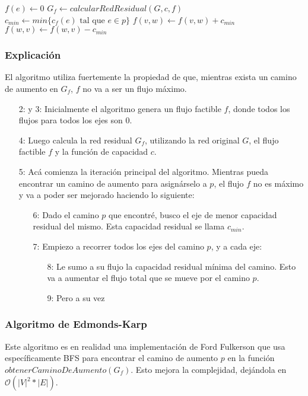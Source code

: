 \begin{algorithm}
\begin{algorithmic}[1]
    \State $f(e) \gets 0$
  \EndFor
  \State $G_f \gets calcularRedResidual(G, c, f)$
    \State $c_{min} \gets min\{c_f(e) \textrm{ tal que } e \in p\}$
        \State $f(v,w) \gets f(v,w) + c_{min}$
        \State $f(w,v) \gets f(w,v) - c_{min}$ 
    \EndFor
  \EndWhile
\EndFunction
\end{algorithmic}
\end{algorithm}

\subsubsection*{Explicaci\'on}

El algoritmo utiliza fuertemente la propiedad de que, mientras exista un camino de aumento en $G_f$, $f$ no va a ser un flujo m\'aximo. 

\begin{enumerate}
\item [2: y 3:] Inicialmente el algoritmo genera un flujo factible $f$, donde todos los flujos para todos los ejes son $0$.
\item [4:] Luego calcula la red residual $G_f$, utilizando la red original $G$, el flujo factible $f$ y la funci\'on de capacidad $c$.
\item [5:] Ac\'a comienza la iteraci\'on principal del algoritmo. Mientras pueda encontrar un camino de aumento para asign\'arselo a $p$, el flujo $f$ no es m\'aximo y va a poder ser mejorado haciendo lo siguiente:
  \begin{enumerate}
  \item [6:] Dado el camino $p$ que encontr\'e, busco el eje de menor capacidad residual del mismo. Esta capacidad residual se llama $c_{min}$.
  \item [7:] Empiezo a recorrer todos los ejes del camino $p$, y a cada eje:
    \begin{enumerate}
      \item [8:] Le sumo a su flujo la capacidad residual m\'inima del camino. Esto va a aumentar el flujo total que se mueve por el camino $p$.
      \item [9:] Pero a su vez
    \end{enumerate}
  \end{enumerate}
\end{enumerate}

\subsubsection{Algoritmo de Edmonds-Karp}

Este algoritmo es en realidad una implementaci\'on de Ford Fulkerson que usa espec\'ificamente BFS para encontrar el camino de aumento $p$ en la funci\'on $obtenerCaminoDeAumento(G_f)$. Esto mejora la complejidad, dej\'andola en $\mathcal{O}(|V|^2 * |E|)$.

